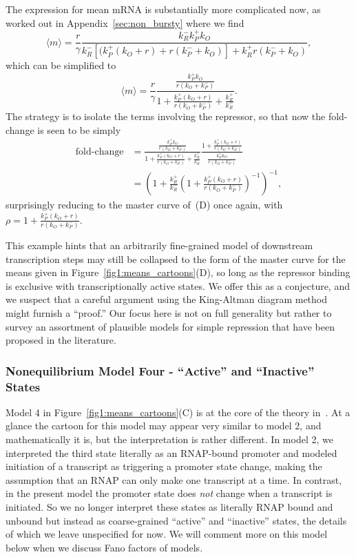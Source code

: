 The expression for mean mRNA is substantially more complicated now, as worked
out in Appendix~\ref{sec:non_bursty} where we find
\begin{equation}
\langle m\rangle = \frac{r}{\gamma}
        \frac{k_R^- k_P^+ k_O}
        {k_R^- [(k_P^+ (k_O + r) + r(k_P^- + k_O)] + k_R^+ r(k_P^- + k_O)},
\label{eq:model3_mean_m}
\end{equation}
which can be simplified to
\begin{equation}
\langle m\rangle
= \frac{r}{\gamma}
\frac{\frac{k_P^+ k_O}{r(k_O + k_P^-)}}
        {1 + \frac{k_P^+ (k_O + r)}{r(k_O + k_P^-)} + \frac{k_R^+}{k_R^-}}.
\end{equation}
The strategy is to isolate the terms involving the repressor, so that now the
fold-change is seen to be simply
\begin{align}
\text{fold-change}
&= \frac{\frac{k_P^+ k_O}{r(k_O + k_P^-)}}
        {1 + \frac{k_P^+ (k_O + r)}{r(k_O + k_P^-)} + \frac{k_R^+}{k_R^-}}
        \frac{1 + \frac{k_P^+ (k_O + r)}{r(k_O + k_P^-)}}
                {\frac{k_P^+ k_O}{r(k_O + k_P^-)}}
\\
&= \left(
        1 + \frac{k_R^+}{k_R^-}
        \left(1 + \frac{k_P^+ (k_O + r)}{r(k_O + k_P^-)}\right)^{-1}
\right)^{-1},
\end{align}
surprisingly reducing to the master curve of~(D) once
again, with $\rho = 1 + \frac{k_P^+ (k_O + r)}{r(k_O + k_P^-)}$.

This example hints that an arbitrarily fine-grained model of downstream
transcription steps may still be collapsed to the form of the master curve for
the means given in Figure~\ref{fig1:means_cartoons}(D), so long as the repressor
binding is exclusive with transcriptionally active states. We offer this as a
conjecture, and we suspect that a careful argument using the King-Altman diagram
method~\cite{King1956, Hill1966} might furnish a ``proof.'' Our focus here is
not on full generality but rather to survey an assortment of plausible models
for simple repression  that have been proposed in the literature.

\subsubsection{Nonequilibrium Model Four - ``Active'' and ``Inactive'' States}
Model 4 in Figure~\ref{fig1:means_cartoons}(C) is at the core of the theory
in~\cite{Razo-Mejia2020}. At a glance the cartoon for this model may appear very
similar to model 2, and mathematically it is, but the interpretation is rather
different. In model 2, we interpreted the third state literally as an RNAP-bound
promoter and modeled initiation of a transcript as triggering a promoter state
change, making the assumption that an RNAP can only
make one transcript at a time. In contrast, in the present model the promoter
state does \textit{not} change when a transcript is initiated. So we no longer
interpret these states as literally RNAP bound and unbound but instead as
coarse-grained ``active'' and ``inactive'' states, the details of which we leave
unspecified for now. We will comment more on this model below when we discuss
Fano factors of models.

